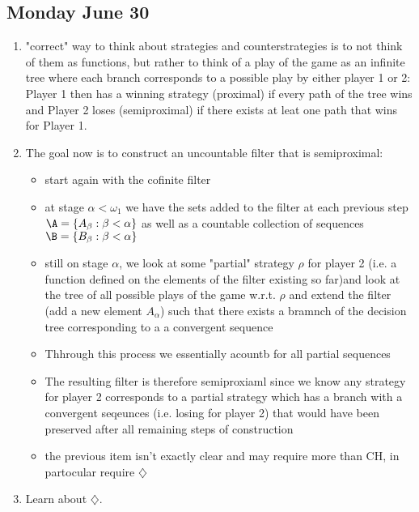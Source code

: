 \documentclass{article}
\begin{document}
\subsection*{Monday June 30}
\begin{enumerate}
    \item "correct" way to think about strategies and counterstrategies is to not think of them as functions, but rather to think of a play of the game as an infinite tree where each branch corresponds to a possible play by either player 1 or 2: Player 1 then has a winning strategy (proximal) if every path of the tree wins and Player 2 loses (semiproximal) if there exists at leat one path that wins for Player 1.
    \item The goal now is to construct an uncountable filter that is semiproximal: 
    \begin{itemize}
        \item start again with the cofinite filter
        \item at stage \(\alpha < \omega_1\) we have the sets added to the filter at each previous step \(\A = \{A_{\beta}: \beta < \alpha\}\) as well as a countable collection of sequences \(\B = \{B_{\beta} : \beta < \alpha\}\) 
        \item still on stage \(\alpha\), we look at some "partial" strategy \(\rho\) for player 2 (i.e. a function defined on the elements of the filter existing so far)and look at the tree of all possible plays of the game w.r.t. \(\rho\)  and extend the filter (add a new element \(A_{\alpha}\)) such that there exists a bramnch of the decision tree corresponding to a a convergent sequence
        \item Thhrough this process we essentially acountb for all partial sequences
        \item The resulting filter is therefore semiproxiaml since we know any strategy for player 2 corresponds to a partial strategy which has a branch with a convergent seqeunces (i.e. losing for player 2) that would have been preserved after all remaining steps of construction
        \item the previous item isn't exactly clear and may require more than CH, in partocular require \(\diamondsuit\)
    \end{itemize}
    \item Learn about \(\diamondsuit\).
\end{enumerate}
\end{document}
